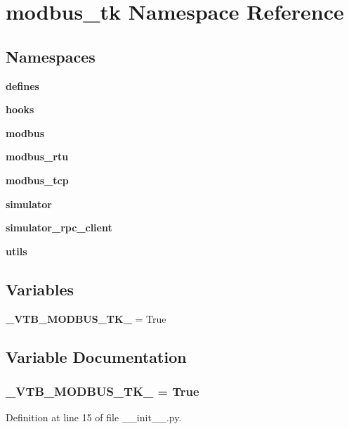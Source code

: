 \section{modbus\+\_\+tk Namespace Reference}
\label{namespacemodbus__tk}
\subsection*{Namespaces}
\begin{DoxyCompactItemize}
\item 
 {\bf defines}
\item 
 {\bf hooks}
\item 
 {\bf modbus}
\item 
 {\bf modbus\+\_\+rtu}
\item 
 {\bf modbus\+\_\+tcp}
\item 
 {\bf simulator}
\item 
 {\bf simulator\+\_\+rpc\+\_\+client}
\item 
 {\bf utils}
\end{DoxyCompactItemize}
\subsection*{Variables}
\begin{DoxyCompactItemize}
\item 
{\bf \+\_\+\+V\+T\+B\+\_\+\+M\+O\+D\+B\+U\+S\+\_\+\+T\+K\+\_\+} = True
\end{DoxyCompactItemize}


\subsection{Variable Documentation}
\subsubsection[{\+\_\+\+V\+T\+B\+\_\+\+M\+O\+D\+B\+U\+S\+\_\+\+T\+K\+\_\+}]{\setlength{\rightskip}{0pt plus 5cm}\+\_\+\+V\+T\+B\+\_\+\+M\+O\+D\+B\+U\+S\+\_\+\+T\+K\+\_\+ = True}\label{namespacemodbus__tk_a3de03be5820c06cc016b56782811db90}


Definition at line 15 of file \+\_\+\+\_\+init\+\_\+\+\_\+.\+py.

